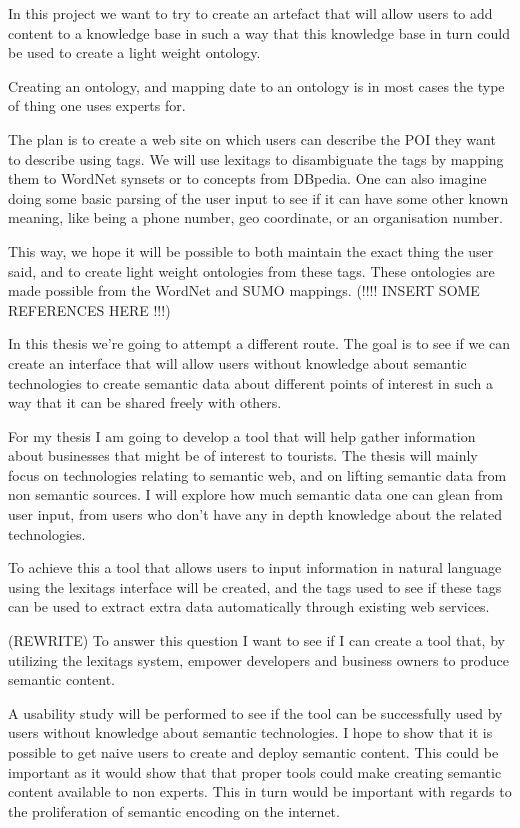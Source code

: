 In this project we want to try to create an artefact that will allow users to add content to a knowledge base in such a way that this knowledge base in turn could be used to create a light weight ontology.

Creating an ontology, and mapping date to an ontology is in most cases the type of thing one uses experts for.

The plan is to create a web site on which users can describe the POI they want to describe using tags.
We will use lexitags to disambiguate the tags by mapping them to WordNet synsets or to concepts from DBpedia. 
One can also imagine doing some basic parsing of the user input to see if it can have some other known meaning, like being a phone number, geo coordinate, or an organisation number.

This way, we hope it will be possible to both maintain the exact thing the user said, and to create light weight ontologies from these tags. 
These ontologies are made possible from the WordNet and SUMO mappings. (!!!! INSERT SOME REFERENCES HERE !!!)

In this thesis we're going to attempt a different route. 
The goal is to see if we can create an interface that will allow users without knowledge about semantic technologies to create semantic data about different points of interest in such a way that it can be shared freely with others.


For my thesis I am going to develop a tool that will help gather information about businesses that might be of interest to tourists.
The thesis will mainly focus on technologies relating to semantic web, and on lifting semantic data from non semantic sources.
I will explore how much semantic data one can glean from user input, from users who don't have any in depth knowledge about the related technologies.

To achieve this a tool that allows users to input information in natural language using the lexitags interface will be created, and the tags used to see if these tags can be used to extract extra data automatically through existing web services.

(REWRITE) To answer this question I want to see if I can create a tool that, by utilizing the lexitags system, empower developers and business owners to produce semantic content. 

A  usability study will be performed to see if the tool can be successfully used by users without knowledge about semantic technologies. 
I hope to show that it is possible to get naive users to create and deploy semantic content.
This could be important as it would show that that proper tools could make creating semantic content available to non experts. This in turn would be important with regards to the proliferation of semantic encoding on the internet.

